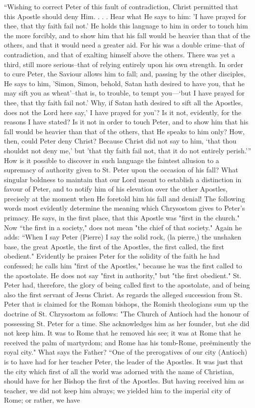 “Wishing to correct Peter of this fault of contradiction, Christ permitted that this Apostle should deny Him. . . . Hear what He says to him: 'I have prayed for thee, that thy faith fail not.' He holds this language to him in order to touch him the more forcibly, and to show him that his fall would be heavier than that of the others, and that it would need a greater aid. For his was a double crime--that of contradiction, and that of exalting himself above the others. There was yet a third, still more serious--that of relying entirely upon his own strength. In order to cure Peter, the Saviour allows him to fall; and, passing by the other disciples, He says to him, 'Simon, Simon, behold, Satan hath desired to have you, that he may sift you as wheat'--that is, to trouble, to tempt you—‘but I have prayed for thee, that thy faith fail not.' Why, if Satan hath desired to sift all the Apostles, does not the Lord here say,' I have prayed for you'? Is it not, evidently, for the reasons I have stated? Is it not in order to touch Peter, and to show him that his fall would be heavier than that of the others, that He speaks to him only? How, then, could Peter deny Christ? Because Christ did not say to him, ‘that thou shouldst not deny me,' but 'that thy faith fail not, that it do not entirely perish.’” How is it possible to discover in such language the faintest allusion to a supremacy of authority given to St. Peter upon the occasion of his fall? What singular boldness to maintain that our Lord meant to establish a distinction in favour of Peter, and to notify him of his elevation over the other Apostles, precisely at the moment when He foretold him his fall and denial! The following words most evidently determine the meaning which Chrysostom gives to Peter's primacy. He says, in the first place, that this Apostle was "first in the church." Now “the first in a society," does not mean "the chief of that society." Again he adds: “When I say Peter (Pierre) I say the solid rock, (la pierre,) the unshaken base, the great Apostle, the first of the Apostles, the first called, the first obedient." Evidently he praises Peter for the solidity of the faith he had confessed; he calls him "first of the Apostles," because he was the first called to the apostolate. He does not say "first in authority," but "the first obedient." St. Peter had, therefore, the glory of being called first to the apostolate, and of being also the first servant of Jesus Christ. As regards the alleged succession from St. Peter that is claimed for the Roman bishops, the Romish theologians sum up the doctrine of St. Chrysostom as follows: "The Church of Antioch had the honour of possessing St. Peter for a time. She acknowledges him as her founder, but she did not keep him. It was to Rome that he removed his see; it was at Rome that he received the palm of martyrdom; and Rome has his tomb-Rome, preëminently the royal city." What says the Father? “One of the prerogatives of our city (Antioch) is to have had for her teacher Peter, the leader of the Apostles. It was just that the city which first of all the world was adorned with the name of Christian, should have for her Bishop the first of the Apostles. But having received him as teacher, we did not keep him always; we yielded him to the imperial city of Rome; or rather, we have 